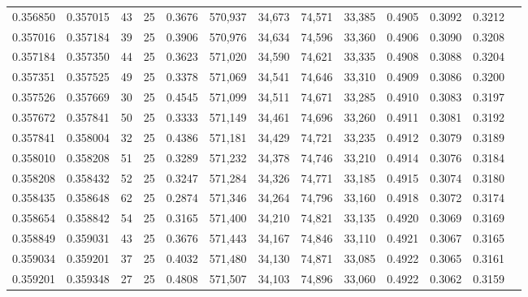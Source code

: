 \begin{tabular}{rrrrrrrrrrrrr}
0.356850 & 0.357015 &    43 &  25 &                                     0.3676 & 570,937 &  34,673 &  74,571 &  33,385 & 0.4905 & 0.3092 & 0.3212 \\
0.357016 & 0.357184 &    39 &  25 &                                     0.3906 & 570,976 &  34,634 &  74,596 &  33,360 & 0.4906 & 0.3090 & 0.3208 \\
0.357184 & 0.357350 &    44 &  25 &                                     0.3623 & 571,020 &  34,590 &  74,621 &  33,335 & 0.4908 & 0.3088 & 0.3204 \\
0.357351 & 0.357525 &    49 &  25 &                                     0.3378 & 571,069 &  34,541 &  74,646 &  33,310 & 0.4909 & 0.3086 & 0.3200 \\
0.357526 & 0.357669 &    30 &  25 &                                     0.4545 & 571,099 &  34,511 &  74,671 &  33,285 & 0.4910 & 0.3083 & 0.3197 \\
0.357672 & 0.357841 &    50 &  25 &                                     0.3333 & 571,149 &  34,461 &  74,696 &  33,260 & 0.4911 & 0.3081 & 0.3192 \\
0.357841 & 0.358004 &    32 &  25 &                                     0.4386 & 571,181 &  34,429 &  74,721 &  33,235 & 0.4912 & 0.3079 & 0.3189 \\
0.358010 & 0.358208 &    51 &  25 &                                     0.3289 & 571,232 &  34,378 &  74,746 &  33,210 & 0.4914 & 0.3076 & 0.3184 \\
0.358208 & 0.358432 &    52 &  25 &                                     0.3247 & 571,284 &  34,326 &  74,771 &  33,185 & 0.4915 & 0.3074 & 0.3180 \\
0.358435 & 0.358648 &    62 &  25 &                                     0.2874 & 571,346 &  34,264 &  74,796 &  33,160 & 0.4918 & 0.3072 & 0.3174 \\
0.358654 & 0.358842 &    54 &  25 &                                     0.3165 & 571,400 &  34,210 &  74,821 &  33,135 & 0.4920 & 0.3069 & 0.3169 \\
0.358849 & 0.359031 &    43 &  25 &                                     0.3676 & 571,443 &  34,167 &  74,846 &  33,110 & 0.4921 & 0.3067 & 0.3165 \\
0.359034 & 0.359201 &    37 &  25 &                                     0.4032 & 571,480 &  34,130 &  74,871 &  33,085 & 0.4922 & 0.3065 & 0.3161 \\
0.359201 & 0.359348 &    27 &  25 &                                     0.4808 & 571,507 &  34,103 &  74,896 &  33,060 & 0.4922 & 0.3062 & 0.3159 \\

\end{tabular}
